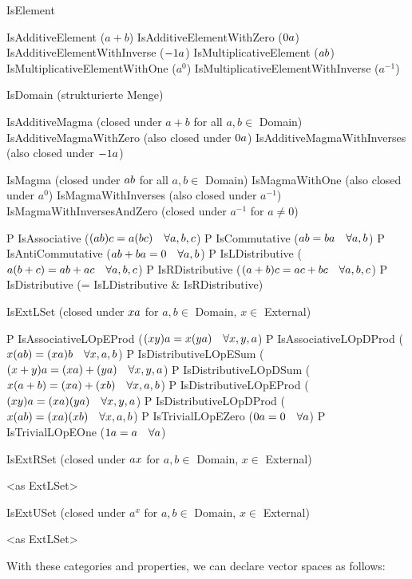   IsElement

    IsAdditiveElement                    ($a + b$)
    IsAdditiveElementWithZero            ($0 \* a$)
    IsAdditiveElementWithInverse         ($-1 \* a$)
    IsMultiplicativeElement              ($a \* b$)
    IsMultiplicativeElementWithOne       ($a^0$)
    IsMultiplicativeElementWithInverse   ($a^{-1}$)

  IsDomain (strukturierte Menge)

    IsAdditiveMagma (closed under $a + b$ for all $a, b \in$ Domain)
      IsAdditiveMagmaWithZero (also closed under $0\*a$)
        IsAdditiveMagmaWithInverses (also closed under $-1\*a$)

    IsMagma (closed under $a \* b$ for all $a, b \in$ Domain)
      IsMagmaWithOne (also closed under $a^0$)
        IsMagmaWithInverses (also closed under $a^{-1}$)
        IsMagmaWithInversesAndZero (closed under $a^{-1}$ for $a\not=0$)

    P IsAssociative     ($(a\*b)\*c = a\*(b\*c)\quad\forall a,b,c$)
    P IsCommutative     ($a\*b = b\*a\quad\forall a,b$)
    P IsAntiCommutative ($a\*b + b\*a = 0\quad\forall a,b$)
    P IsLDistributive   ($a\*(b + c) = a\*b + a\*c\quad\forall a,b,c$)
    P IsRDistributive   ($(a + b)\*c = a\*c + b\*c\quad\forall a,b,c$)
    P IsDistributive    (= IsLDistributive \& IsRDistributive)

    IsExtLSet (closed under $x \* a$ for $a, b \in$ Domain, $x \in$ External)

    P IsAssociativeLOpEProd   ($(x\*y)\*a = x\*(y\*a)\quad\forall x,y,a$)
    P IsAssociativeLOpDProd   ($x\*(a\*b) = (x\*a)\*b\quad\forall x,a,b$)
    P IsDistributiveLOpESum   ($(x + y)\*a = (x\*a) + (y\*a)\quad\forall x,y,a$)
    P IsDistributiveLOpDSum   ($x\*(a + b) = (x\*a) + (x\*b)\quad\forall x,a,b$)
    P IsDistributiveLOpEProd  ($(x\*y)\*a = (x\*a)\*(y\*a)\quad\forall x,y,a$)
    P IsDistributiveLOpDProd  ($x\*(a\*b) = (x\*a)\*(x\*b)\quad\forall x,a,b$)
    P IsTrivialLOpEZero       ($0\*a       = 0\quad\forall a$)
    P IsTrivialLOpEOne        ($1\*a       = a\quad\forall a$)

    IsExtRSet (closed under $a \* x$ for $a, b \in$ Domain, $x \in$ External)

      <as ExtLSet>

    IsExtUSet (closed under $a^x$ for $a, b \in$ Domain, $x \in$ External)

      <as ExtLSet>
\endtt

With these categories and properties, we can declare vector spaces as
follows:

